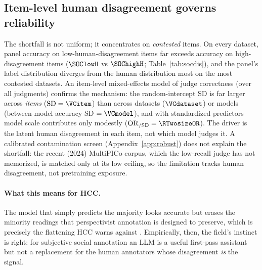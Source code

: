 \begin{table}[t]\centering\small
\caption{Study 2. Open panel vs the human-human ceiling on \SOCndat{} subjective social-computing datasets. Ceiling
= random-annotator-vs-majority accuracy; macro-F1 is the best model's chance-corrected score.}
\label{tab:socres}

\end{table}

\subsection{Item-level human disagreement governs reliability}
The shortfall is not uniform; it concentrates on \emph{contested} items. On every dataset, panel accuracy on
low-human-disagreement items far exceeds accuracy on high-disagreement items ($\SOClowH$ vs $\SOChighH$;
Table~\ref{tab:socdis}), and the panel's label distribution diverges from the human distribution most on the most
contested datasets. An item-level mixed-effects model of judge correctness (over all \SOCnjudg{} judgments) confirms
the mechanism: the random-intercept SD is far larger across \emph{items} ($\mathrm{SD}=\VCitem$) than across datasets
($\VCdataset$) or models (between-model accuracy SD $=\VCmodel$), and with standardized predictors model scale
contributes only modestly ($\mathrm{OR}_{/\mathrm{SD}}=\RTwosizeOR$). The driver is the latent human disagreement in
each item, not which model judges it. A calibrated contamination screen (Appendix~\ref{app:robust}) does not explain
the shortfall: the recent (2024) MultiPICo corpus, which the low-recall judge has not memorized, is matched only at
its low ceiling, so the limitation tracks human disagreement, not pretraining exposure.

\begin{table}[t]\centering\small
\caption{Study 2 disagreement-aware results. Ceiling with annotator-bootstrap 95\% CI; best-model $\kappa$ and
macro-F1; panel accuracy on low- vs high-human-disagreement items; Jensen-Shannon panel-vs-human divergence. Judges
lose accuracy precisely as human disagreement rises.}
\label{tab:socdis}

\end{table}

\paragraph{What this means for HCC.} The model that simply predicts the majority looks accurate but erases the
minority readings that perspectivist annotation is designed to preserve, which is precisely the flattening HCC warns
against \citep{wang2024flatten,fricker2007epistemic}. Empirically, then, the field's instinct is right: for
subjective social annotation an LLM is a useful first-pass assistant but not a replacement for the human annotators
whose disagreement \emph{is} the signal.
